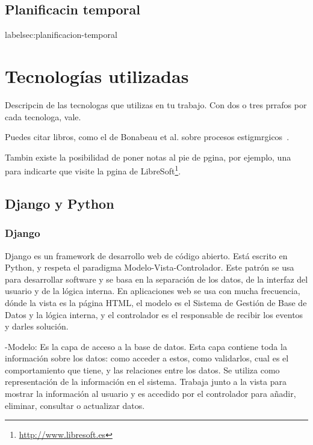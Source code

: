 \documentclass[a4paper, 12pt]{book}
\begin{document}
\section{Planificacin temporal}
label{sec:planificacion-temporal}




\cleardoublepage
\chapter{Tecnolog\'ias utilizadas}

Descripcin de las tecnologas que utilizas en tu trabajo. Con dos o tres prrafos por cada tecnologa, vale.


Puedes citar libros, como el de Bonabeau et al. sobre procesos estigmrgicos~\cite{bonabeau:_swarm}. %

Tambin existe la posibilidad de poner notas al pie de pgina, por ejemplo, 
una para indicarte que visite la pgina de 
LibreSoft\footnote{\url{http://www.libresoft.es}}.

\section{Django y Python} 
\label{sec:djangopython}

\subsection{Django} 
\label{subsec:django}
Django es un framework de desarrollo web de c\'odigo abierto. Est\'a escrito en Python, y respeta el paradigma Modelo-Vista-Controlador. 
Este patr\'on se usa para desarrollar software y se basa en la separaci\'on de los datos, de la interfaz del usuario y de la l\'ogica interna. 
En aplicaciones web se usa con mucha frecuencia, d\'onde la vista es la p\'agina HTML, el modelo es el Sistema de Gesti\'on de Base de Datos y la 
l\'ogica interna, y el controlador es el responsable de recibir los eventos y darles soluci\'on.

-Modelo: Es la capa de acceso a la base de datos. Esta capa contiene toda la informaci\'on sobre los datos: como acceder a estos, como validarlos, 
cual es el comportamiento que tiene, y las relaciones entre los datos. Se utiliza como representaci\'on de la informaci\'on en el sistema. Trabaja junto 
a la vista para mostrar la informaci\'on al usuario y es accedido por el controlador para a\~nadir, eliminar, consultar o actualizar datos. 
     
\end{document}
